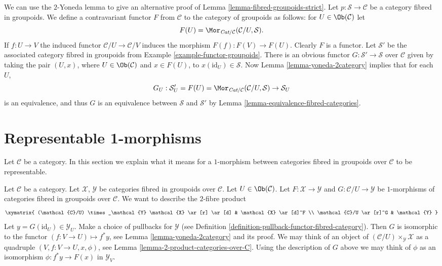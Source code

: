 \begin{remark}
\label{remark-alternative-fibred-groupoids-strict}
We can use the $2$-Yoneda lemma to give an alternative proof of
Lemma \ref{lemma-fibred-groupoids-strict}.
Let $p : \mathcal{S} \to \mathcal{C}$ be a category fibred in groupoids.
We define a contravariant functor $F$ from $\mathcal{C}$ to the
category of groupoids as follows: for $U\in \Ob(\mathcal{C})$
let
$$
F(U) = \Mor_{\textit{Cat}/\mathcal{C}}(\mathcal{C}/U, \mathcal{S}).
$$
If $f : U \to V$ the induced functor $\mathcal{C}/U \to \mathcal{C}/V$
induces the morphism $F(f) : F(V) \to F(U)$. Clearly $F$ is a functor.
Let $\mathcal{S}'$ be the associated category fibred in groupoids from
Example \ref{example-functor-groupoids}.
There is an obvious functor $G : \mathcal{S}' \to \mathcal{S}$
over $\mathcal{C}$ given by taking the pair $(U, x)$, where
$U \in \Ob(\mathcal{C})$ and $x \in F(U)$, to
$x(\text{id}_U) \in \mathcal{S}$.  Now
Lemma \ref{lemma-yoneda-2category}
implies that for each $U$,
$$
G_U : \mathcal{S}'_U = F(U)=
\Mor_{\textit{Cat}/\mathcal{C}}(\mathcal{C}/U, \mathcal{S})
\to
\mathcal{S}_U
$$
is an equivalence, and thus $G$ is an equivalence between $\mathcal{S}$ and
$\mathcal{S}'$ by Lemma \ref{lemma-equivalence-fibred-categories}.
\end{remark}





\section{Representable 1-morphisms}
\label{section-representable-1-morphisms}

\noindent
Let $\mathcal{C}$ be a category.
In this section we explain what it means for a $1$-morphism
between categories fibred in groupoids over $\mathcal{C}$
to be representable.

\medskip\noindent
Let $\mathcal{C}$ be a category.
Let $\mathcal{X}$, $\mathcal{Y}$ be categories fibred in groupoids
over $\mathcal{C}$.
Let $U \in \Ob(\mathcal{C})$.
Let $F : \mathcal{X} \to \mathcal{Y}$ and
$G : \mathcal{C}/U \to \mathcal{Y}$ be $1$-morphisms of categories
fibred in groupoids over $\mathcal{C}$.
We want to describe
the $2$-fibre product
$$
\xymatrix{
(\mathcal{C}/U) \times_\mathcal{Y} \mathcal{X} \ar[r] \ar[d] &
\mathcal{X} \ar[d]^F \\
\mathcal{C}/U \ar[r]^G &
\mathcal{Y}
}
$$
Let $y = G(\text{id}_U) \in \mathcal{Y}_U$.
Make a choice of pullbacks for $\mathcal{Y}$
(see Definition \ref{definition-pullback-functor-fibred-category}).
Then $G$ is isomorphic to the functor $(f : V \to U) \mapsto f^*y$,
see Lemma \ref{lemma-yoneda-2category} and its proof.
We may think of an object of
$(\mathcal{C}/U) \times_\mathcal{Y} \mathcal{X}$
as a quadruple $(V, f : V \to U, x, \phi)$, see
Lemma \ref{lemma-2-product-categories-over-C}.
Using the description of $G$ above we may think of $\phi$ as
an isomorphism $\phi : f^*y \to F(x)$ in $\mathcal{Y}_V$.

